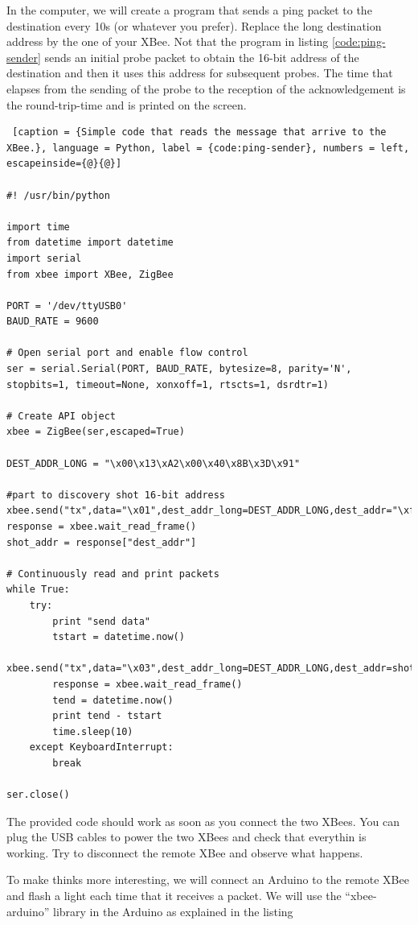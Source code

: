In the computer, we will create a program that sends a ping packet to the destination every 10s (or whatever you prefer).
Replace the long destination address by the one of your XBee.
Not that the program in listing \ref{code:ping-sender} sends an initial probe packet to obtain the 16-bit address of the destination and then it uses this address for subsequent probes.
The time that elapses from the sending of the probe to the reception of the acknowledgement is the round-trip-time and is printed on the screen.

\begin{lstlisting} [caption = {Simple code that reads the message that arrive to the XBee.}, language = Python, label = {code:ping-sender}, numbers = left, escapeinside={@}{@}]

#! /usr/bin/python

import time
from datetime import datetime
import serial
from xbee import XBee, ZigBee

PORT = '/dev/ttyUSB0'
BAUD_RATE = 9600

# Open serial port and enable flow control
ser = serial.Serial(PORT, BAUD_RATE, bytesize=8, parity='N', stopbits=1, timeout=None, xonxoff=1, rtscts=1, dsrdtr=1)

# Create API object
xbee = ZigBee(ser,escaped=True)

DEST_ADDR_LONG = "\x00\x13\xA2\x00\x40\x8B\x3D\x91"

#part to discovery shot 16-bit address
xbee.send("tx",data="\x01",dest_addr_long=DEST_ADDR_LONG,dest_addr="\xff\xfe")
response = xbee.wait_read_frame()
shot_addr = response["dest_addr"]

# Continuously read and print packets
while True:
    try:
        print "send data"
        tstart = datetime.now()
        xbee.send("tx",data="\x03",dest_addr_long=DEST_ADDR_LONG,dest_addr=shot_addr)
        response = xbee.wait_read_frame()
        tend = datetime.now()
        print tend - tstart
        time.sleep(10)
    except KeyboardInterrupt:
        break

ser.close()

\end{lstlisting}

The provided code should work as soon as you connect the two XBees. 
You can plug the USB cables to power the two XBees and check that everythin is working.
Try to disconnect the remote XBee and observe what happens.

To make thinks more interesting, we will connect an Arduino to the remote XBee and flash a light each time that it receives a packet.
We will use the ``xbee-arduino'' library in the Arduino as explained in the listing 
